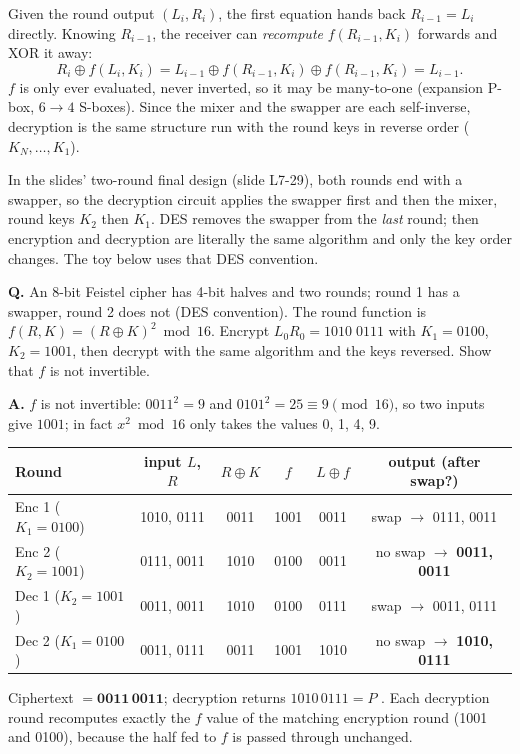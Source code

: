 \begin{mustknow}
Given the round output $(L_i, R_i)$, the first equation hands back $R_{i-1} = L_i$ directly. Knowing $R_{i-1}$, the receiver can \emph{recompute} $f(R_{i-1}, K_i)$ forwards and XOR it away:
\[
R_i \oplus f(L_i, K_i) = L_{i-1} \oplus f(R_{i-1}, K_i) \oplus f(R_{i-1}, K_i) = L_{i-1}.
\]
$f$ is only ever evaluated, never inverted, so it may be many-to-one (expansion P-box, $6 \to 4$ S-boxes). Since the mixer and the swapper are each self-inverse, decryption is the same structure run with the round keys in reverse order ($K_N, \dots, K_1$).
\end{mustknow}

In the slides' two-round final design (slide L7-29), both rounds end with a swapper, so the decryption circuit applies the swapper first and then the mixer, round keys $K_2$ then $K_1$. DES removes the swapper from the \emph{last} round; then encryption and decryption are literally the same algorithm and only the key order changes. The toy below uses that DES convention.

\begin{worked}
\textbf{Q.} An 8-bit Feistel cipher has 4-bit halves and two rounds; round 1 has a swapper, round 2 does not (DES convention). The round function is $f(R, K) = (R \oplus K)^2 \bmod 16$. Encrypt $L_0 R_0 = 1010\;0111$ with $K_1 = 0100$, $K_2 = 1001$, then decrypt with the same algorithm and the keys reversed. Show that $f$ is not invertible.

\textbf{A.} $f$ is not invertible: $0011^2 = 9$ and $0101^2 = 25 \equiv 9 \pmod{16}$, so two inputs give $1001$; in fact $x^2 \bmod 16$ only takes the values 0, 1, 4, 9.
\begin{center}\small
\begin{tabular}{@{}lccccc@{}}
\toprule
Round & input $L$, $R$ & $R \oplus K$ & $f$ & $L \oplus f$ & output (after swap?)\\
\midrule
Enc 1 ($K_1 = 0100$) & 1010, 0111 & 0011 & 1001 & 0011 & swap $\to$ 0111, 0011\\
Enc 2 ($K_2 = 1001$) & 0111, 0011 & 1010 & 0100 & 0011 & no swap $\to$ \textbf{0011, 0011}\\
\midrule
Dec 1 ($K_2 = 1001$) & 0011, 0011 & 1010 & 0100 & 0111 & swap $\to$ 0011, 0111\\
Dec 2 ($K_1 = 0100$) & 0011, 0111 & 0011 & 1001 & 1010 & no swap $\to$ \textbf{1010, 0111}\\
\bottomrule
\end{tabular}
\end{center}
Ciphertext $= \mathbf{0011\,0011}$; decryption returns $1010\,0111 = P$ \checkmark. Each decryption round recomputes exactly the $f$ value of the matching encryption round (1001 and 0100), because the half fed to $f$ is passed through unchanged.
\end{worked}

